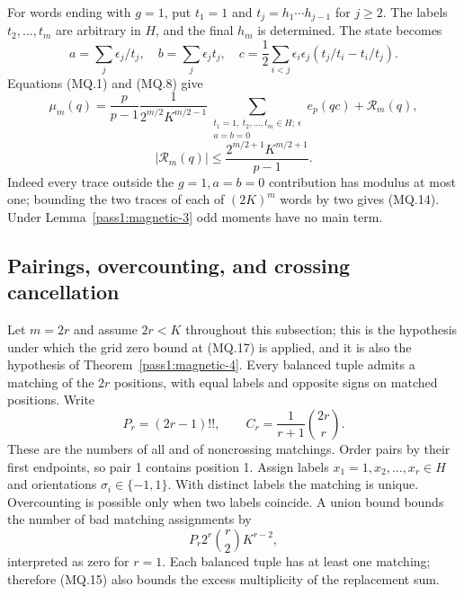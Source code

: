 For words ending with \(g=1\), put \(t_1=1\) and \(t_j=h_1\cdots h_{j-1}\) for \(j\geq2\). The labels \(t_2,\ldots,t_m\) are arbitrary in \(H\), and the final \(h_m\) is determined. The state becomes \[
 a=\sum_j\epsilon_j/t_j,\quad b=\sum_j\epsilon_jt_j,\quad
 c=\frac12\sum_{i<j}\epsilon_i\epsilon_j(t_j/t_i-t_i/t_j).
\] Equations (MQ.1) and (MQ.8) give \[
 \mu_m(q)=\frac{p}{p-1}\frac{1}{2^{m/2}K^{m/2-1}}
 \sum_{\substack{t_1=1,\ t_2,\ldots,t_m\in H;\ \epsilon\\a=b=0}}
 e_p(qc)+\mathcal R_m(q), \tag{MQ.13}
\] \[
 |\mathcal R_m(q)|\leq\frac{2^{m/2+1}K^{m/2+1}}{p-1}. \tag{MQ.14}
\] Indeed every trace outside the \(g=1,a=b=0\) contribution has modulus at most one; bounding the two traces of each of \((2K)^m\) words by two gives (MQ.14). Under Lemma~\ref{pass1:magnetic-3} odd moments have no main term.

\subsection{Pairings, overcounting, and crossing cancellation}\label{magnetic:pairings-overcounting-and-crossing-cancellation}

Let \(m=2r\) and assume \(2r<K\) throughout this subsection; this is the hypothesis under which the grid zero bound at (MQ.17) is applied, and it is also the hypothesis of Theorem~\ref{pass1:magnetic-4}. Every balanced tuple admits a matching of the \(2r\) positions, with equal labels and opposite signs on matched positions. Write \[
 P_r=(2r-1)!!,\qquad C_r=\frac1{r+1}\binom{2r}{r}.
\] These are the numbers of all and of noncrossing matchings. Order pairs by their first endpoints, so pair 1 contains position 1. Assign labels \(x_1=1,x_2,\ldots,x_r\in H\) and orientations \(\sigma_i\in\{-1,1\}\). With distinct labels the matching is unique. Overcounting is possible only when two labels coincide. A union bound bounds the number of bad matching assignments by \[
 P_r2^r\binom r2 K^{r-2}, \tag{MQ.15}
\] interpreted as zero for \(r=1\). Each balanced tuple has at least one matching; therefore (MQ.15) also bounds the excess multiplicity of the replacement sum.

